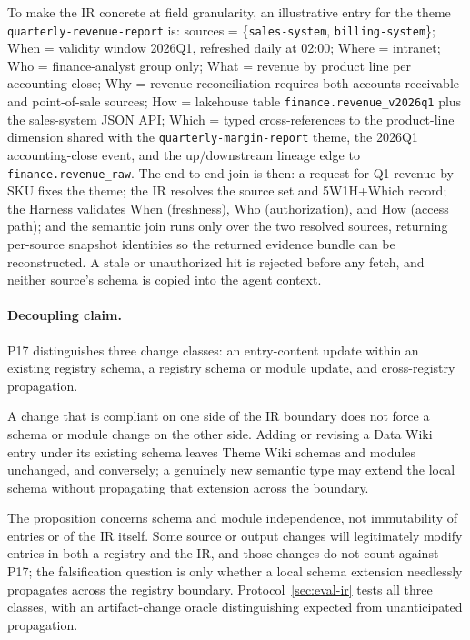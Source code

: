 To make the IR concrete at field granularity, an illustrative entry for the theme \texttt{quarterly-revenue-report} is: sources = \{\texttt{sales-system}, \texttt{billing-system}\}; When = validity window 2026Q1, refreshed daily at 02:00; Where = intranet; Who = finance-analyst group only; What = revenue by product line per accounting close; Why = revenue reconciliation requires both accounts-receivable and point-of-sale sources; How = lakehouse table \texttt{finance.revenue\_v2026q1} plus the sales-system JSON API; Which = typed cross-references to the product-line dimension shared with the \texttt{quarterly-margin-report} theme, the 2026Q1 accounting-close event, and the up/downstream lineage edge to \texttt{finance.revenue\_raw}. The end-to-end join is then: a request for Q1 revenue by SKU fixes the theme; the IR resolves the source set and 5W1H+Which record; the Harness validates When (freshness), Who (authorization), and How (access path); and the semantic join runs only over the two resolved sources, returning per-source snapshot identities so the returned evidence bundle can be reconstructed. A stale or unauthorized hit is rejected before any fetch, and neither source's schema is copied into the agent context.

\paragraph{Decoupling claim.}
P17 distinguishes three change classes: an entry-content update within an existing registry schema, a registry schema or module update, and cross-registry propagation.

\begin{proposition}
\label{prop:p17}
A change that is compliant on one side of the IR boundary does not force a schema or module change on the other side. Adding or revising a Data Wiki entry under its existing schema leaves Theme Wiki schemas and modules unchanged, and conversely; a genuinely new semantic type may extend the local schema without propagating that extension across the boundary.
\end{proposition}

The proposition concerns schema and module independence, not immutability of entries or of the IR itself. Some source or output changes will legitimately modify entries in both a registry and the IR, and those changes do not count against P17; the falsification question is only whether a local schema extension needlessly propagates across the registry boundary. Protocol~\ref{sec:eval-ir} tests all three classes, with an artifact-change oracle distinguishing expected from unanticipated propagation.

